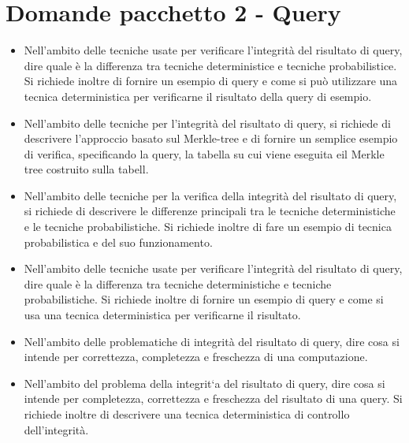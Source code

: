 \documentclass{report}
\begin{document}
\chapter{Domande pacchetto 2 - Query}
\begin{itemize}
    \item Nell'ambito delle tecniche usate per verificare l'integrità del risultato di query, dire quale è la differenza tra
tecniche deterministice e tecniche probabilistice. Si richiede inoltre di fornire un esempio di query e come si
può utilizzare una tecnica deterministica per verificarne il risultato della query di esempio.
    \item Nell'ambito delle tecniche per l'integrità del risultato di query, si richiede di descrivere l'approccio basato sul
Merkle-tree e di fornire un semplice esempio di verifica, specificando la query, la tabella su cui viene eseguita
eil Merkle tree costruito sulla tabell.
    \item Nell'ambito delle tecniche per la verifica della integrità del risultato di query, si richiede di descrivere le differenze
principali tra le tecniche deterministiche e le tecniche probabilistiche. Si richiede inoltre di fare un esempio di
tecnica probabilistica e del suo funzionamento.
    \item Nell'ambito delle tecniche usate per verificare l'integrità del risultato di query, dire quale è la differenza tra
tecniche deterministiche e tecniche probabilistiche. Si richiede inoltre di fornire un esempio di query e come si
usa una tecnica deterministica per verificarne il risultato.
    \item Nell'ambito delle problematiche di integrità del risultato di query, dire cosa si intende per correttezza, completezza e freschezza di una computazione.
    \item Nell'ambito del problema della integrit`a del risultato di query, dire cosa si intende per completezza, correttezza
e freschezza del risultato di una query. Si richiede inoltre di descrivere una tecnica deterministica di controllo
dell'integrità.
\end{itemize}
\end{document}
